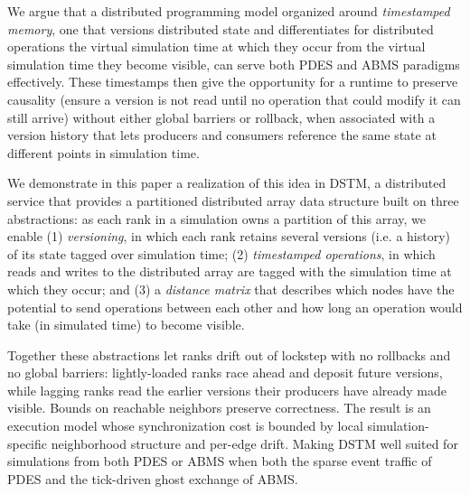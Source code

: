 We argue that a distributed programming model organized around
\emph{timestamped memory}, one that versions distributed state and
differentiates for distributed operations the virtual simulation time at
which they occur from the virtual simulation time they become visible,
can serve both PDES and ABMS paradigms effectively. These timestamps then
give the opportunity for a runtime to preserve causality (ensure a version is not read until no operation that could modify it can still arrive) without either
global barriers or rollback, when associated with a version history that
lets producers and consumers reference the same state at different points
in simulation time.

We demonstrate in this paper a realization of this idea in DSTM, a distributed
service that provides a partitioned distributed array data structure built on three
abstractions: as each rank in a simulation owns a partition of this array, we
enable (1) \emph{versioning}, in which each rank retains several versions (i.e.
a history) of its state tagged over simulation time; (2) \emph{timestamped
operations}, in which reads and writes to the distributed array are tagged with
the simulation time at which they occur; and (3) a \emph{distance matrix} that
describes which nodes have the potential to send operations between each other
and how long an operation would take (in simulated time) to become visible.

Together these abstractions let ranks drift out of lockstep with no rollbacks
and no global barriers: lightly-loaded ranks race ahead and deposit future
versions, while lagging ranks read the earlier versions their producers have
already made visible. Bounds on reachable neighbors preserve correctness. The
result is an execution model whose synchronization cost is bounded by local
simulation-specific neighborhood structure and per-edge drift. Making DSTM well
suited for simulations from both PDES or ABMS when both the sparse event traffic
of PDES and the tick-driven ghost exchange of ABMS.


